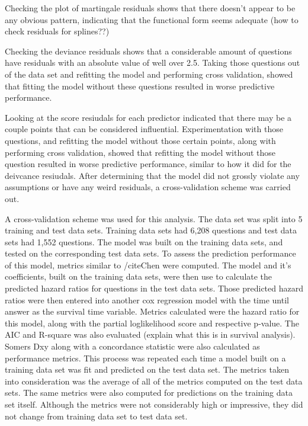 \documentclass[12pt]{article}
\begin{document}
Checking the plot of martingale residuals shows that there doesn’t appear to be any obvious pattern, indicating that the functional form seems adequate (how to check residuals for splines??)

Checking the deviance residuals shows that a considerable amount of questions have residuals with an absolute value of well over 2.5. Taking those questions out of the data set and refitting the model and performing cross validation, showed that fitting the model without these questions resulted in worse predictive performance. 

Looking at the score resiudals for each predictor indicated that there may be a couple points that can be considered influential. Experimentation with those questions, and refitting the model without those certain points, along with performing cross validation, showed that refitting the model without those question resulted in worse predictive performance, similar to how it did for the deivcance resiudals. 
After determining that the model did not grossly violate any assumptions or have any weird residuals, a cross-validation scheme was carried out. 

A cross-validation scheme was used for this analysis. The data set was split into 5 training and test data sets. Training data sets had 6,208 questions and test data sets had 1,552 questions. The model was built on the training data sets, and tested on the corresponding test data sets. To assess the prediction performance of this model, metrics similar to /cite{Chen} were computed. The model and it’s coefficients, built on the training data sets, were then use to calculate the predicted hazard ratios for questions in the test data sets. Those predicted hazard ratios were then entered into another cox regression model with the time until answer as the survival time variable. Metrics calculated were the hazard ratio for this model, along with the partial loglikelihood score and respective p-value. The AIC and R-square was also evaluated (explain what this is in survival analysis). Somers Dxy along with a concordance statistic were also calculated as performance metrics. This process was repeated each time a model built on a training data set was fit and predicted on the test data set. The metrics taken into consideration was the average of all of the metrics computed on the test data sets. The same metrics were also computed for predictions on the training data set itself. Although the metrics were not considerably high or impressive, they did not change from training data set to test data set. 
\end{document}
